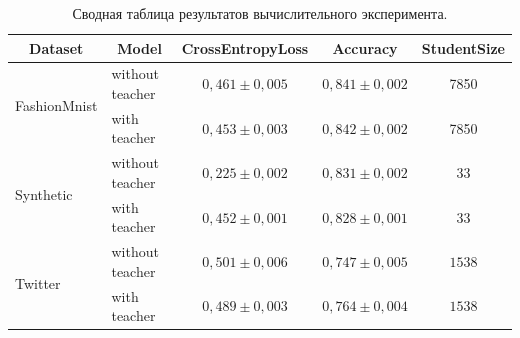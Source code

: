 \begin{table}[]
\caption{Сводная таблица результатов вычислительного эксперимента.}
\label{tb:ce:1}
\begin{center}
\begin{tabular}{|l|l|c|c|c|}
\hline
\multicolumn{1}{|c|}{Dataset} & \multicolumn{1}{c|}{Model} & CrossEntropyLoss      & Accuracy    &   StudentSize   \\ \hline
\multirow{2}{*}{FashionMnist} & without teacher    &  $0{,}461 \pm 0{,}005$ & $0{,}841\pm 0{,}002$ & 7850 \\ \cline{2-5} 
                              & with teacher       & $0{,}453 \pm 0{,}003$ & $0{,}842 \pm 0{,}002$ & 7850\\ \hline
\multirow{2}{*}{Synthetic}    & without teacher    & $0{,}225 \pm 0{,}002$ & $0{,}831\pm 0{,}002$ & 33 \\ \cline{2-5} 
                              &  with teacher       & $0{,}452 \pm 0{,}001$   & $0{,}828\pm 0{,}001$ & 33 \\ \hline
\multirow{2}{*}{Twitter }    & without teacher    & $0{,}501 \pm 0{,}006$ & $0{,}747\pm 0{,}005$ & $1538$  \\ \cline{2-5} 
                              &with teacher       & $0{,}489 \pm 0{,}003$   & $0{,}764\pm 0{,}004$ & $1538$ \\ \hline
\end{tabular}
\end{center}
\end{table}
